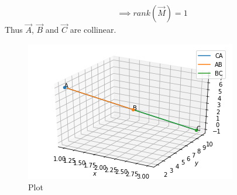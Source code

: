 \documentclass[journal,12pt,twocolumn]{IEEEtran}
\begin{document}
\begin{equation}
   \implies rank(\vec{M}) = 1 
\end{equation}
Thus $\vec{A}$, $\vec{B}$ and $\vec{C}$ are collinear. 

 
\begin{figure}[!h]
         \includegraphics[width=\columnwidth]{Figure.png}
         \caption{Plot}
         \label{plot}
\end{figure}
\end{document}
